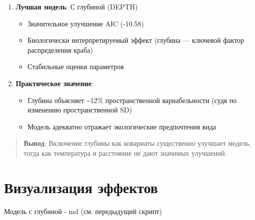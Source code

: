 \documentclass[
  letterpaper,
  DIV=11,
  numbers=noendperiod]{scrreprt}
\begin{document}
\begin{enumerate}
\def\labelenumi{\arabic{enumi}.}
\item
  \textbf{Лучшая модель}: С глубиной (DEPTH)

  \begin{itemize}
  \item
    Значительное улучшение AIC (-10.58)
  \item
    Биологически интерпретируемый эффект (глубина --- ключевой фактор
    распределения краба)
  \item
    Стабильные оценки параметров
  \end{itemize}
\item
  \textbf{Практическое значение}:

  \begin{itemize}
  \item
    Глубина объясняет \textasciitilde12\% пространственной
    вариабельности (судя по изменению пространственной SD)
  \item
    Модель адекватно отражает экологические предпочтения вида
  \end{itemize}
\end{enumerate}

\begin{quote}
\textbf{Вывод}: Включение глубины как ковариаты существенно улучшает
модель, тогда как температура и расстояние не дают значимых улучшений.
\end{quote}

\section{Визуализация
эффектов}\label{ux432ux438ux437ux443ux430ux43bux438ux437ux430ux446ux438ux44f-ux44dux444ux444ux435ux43aux442ux43eux432}

Модель с глубиной - md (см. передыдущий скрипт)
\end{document}
